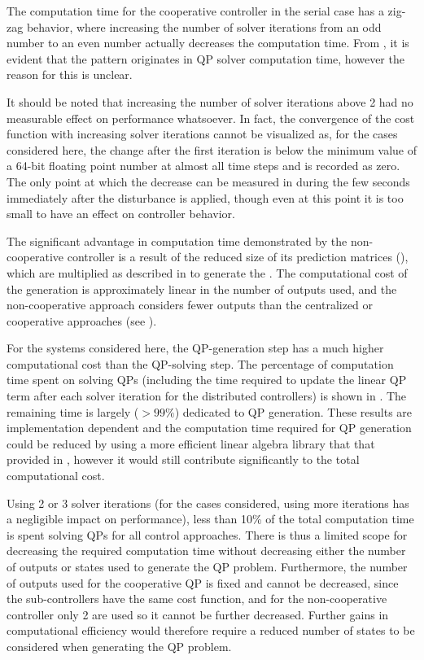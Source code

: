 The computation time for the cooperative controller in the serial case has a zig-zag behavior, where increasing the number of solver iterations from an odd number to an even number actually decreases the computation time.
From , it is evident that the pattern originates in QP solver computation time, however the reason for this is unclear.

It should be noted that increasing the number of solver iterations above 2 had no measurable effect on performance whatsoever.
In fact, the convergence of the cost function with increasing solver iterations cannot be visualized as, for the cases considered here, the change after the first iteration is below the minimum value of a 64-bit floating point number at almost all time steps and is recorded as zero.
The only point at which the decrease can be measured in during the few seconds immediately after the disturbance is applied, though even at this point it is too small to have an effect on controller behavior.

The significant advantage in computation time demonstrated by the non-cooperative controller is a result of the reduced size of its prediction matrices (), which are multiplied as described in  to generate the .
The computational cost of the  generation is approximately linear in the number of outputs used, and the non-cooperative approach considers fewer outputs than the centralized or cooperative approaches (see ).

For the systems considered here, the QP-generation step has a much higher computational cost than the QP-solving step.
The percentage of computation time spent on solving QPs (including the time required to update the linear QP term after each solver iteration for the distributed controllers) is shown in .
The remaining time is largely ($>99\%$) dedicated to QP generation.
These results are implementation dependent and the computation time required for QP generation could be reduced by using a more efficient linear algebra library that that provided in \eigen{}, however it would still contribute significantly to the total computational cost.

Using 2 or 3 solver iterations (for the cases considered, using more iterations has a negligible impact on performance), less than 10\% of the total computation time is spent solving QPs for all control approaches. 
There is thus a limited scope for decreasing the required computation time without decreasing either the number of outputs or states used to generate the QP problem.
Furthermore, the number of outputs used for the cooperative QP is fixed and cannot be decreased, since the sub-controllers have the same cost function, and for the non-cooperative controller only 2 are used so it cannot be further decreased.
Further gains in computational efficiency would therefore require a reduced number of states to be considered when generating the QP problem.

